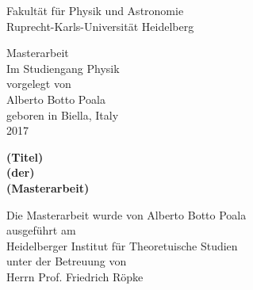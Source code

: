 
\thispagestyle{empty}
\begin{center}
  \renewcommand{\baselinestretch}{2.00}
  \Large\sffamily
  Fakult\"{a}t f\"{u}r Physik und Astronomie\\
  \large
  Ruprecht-Karls-Universit\"{a}t Heidelberg
  \par\vfill\normalfont
  Masterarbeit\\
  Im Studiengang Physik\\
  vorgelegt von\\
  Alberto Botto Poala\\
  geboren in Biella, Italy\\
  2017\\
\end{center}
\newpage

\thispagestyle{empty}
\begin{center}
  \renewcommand{\baselinestretch}{2.00}
  \Large\bfseries\sffamily
    (Titel)\\
    (der)\\
    (Masterarbeit)
  \par
  \vfill
  \large\normalfont
  Die Masterarbeit wurde von Alberto Botto Poala\\
  ausgef\"{u}hrt am\\
  Heidelberger Institut für Theoretuische Studien\\
  unter der Betreuung von\\
  Herrn Prof. Friedrich R\"{o}pke
\end{center}\par
\vspace{5\baselineskip}

\renewcommand{\baselinestretch}{1.00}\normalsize
